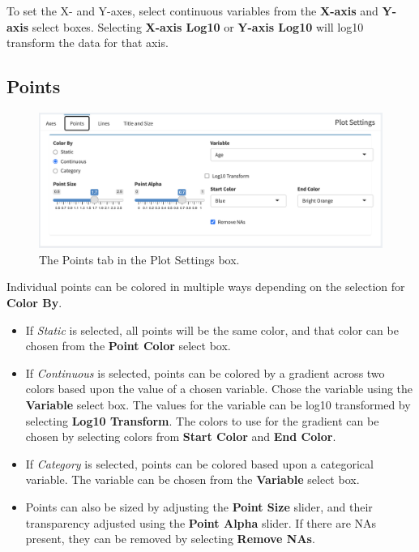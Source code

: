 \documentclass[
]{book}
\begin{document}
To set the X- and Y-axes, select continuous variables from the \textbf{X-axis} and \textbf{Y-axis} select boxes. Selecting \textbf{X-axis Log10} or \textbf{Y-axis Log10} will log10 transform the data for that axis.

\hypertarget{points}{%
\subsection{Points}\label{points}}

\begin{figure}
\centering
\includegraphics{images/Scatter_Points.png}
\caption{The Points tab in the Plot Settings box.}
\end{figure}

Individual points can be colored in multiple ways depending on the selection for \textbf{Color By}.

\begin{itemize}
\item
  If \emph{Static} is selected, all points will be the same color, and that color can be chosen from the \textbf{Point Color} select box.
\item
  If \emph{Continuous} is selected, points can be colored by a gradient across two colors based upon the value of a chosen variable. Chose the variable using the \textbf{Variable} select box. The values for the variable can be log10 transformed by selecting \textbf{Log10 Transform}. The colors to use for the gradient can be chosen by selecting colors from \textbf{Start Color} and \textbf{End Color}.
\item
  If \emph{Category} is selected, points can be colored based upon a categorical variable. The variable can be chosen from the \textbf{Variable} select box.
\item
  Points can also be sized by adjusting the \textbf{Point Size} slider, and their transparency adjusted using the \textbf{Point Alpha} slider. If there are NAs present, they can be removed by selecting \textbf{Remove NAs}.
\end{itemize}
\end{document}
